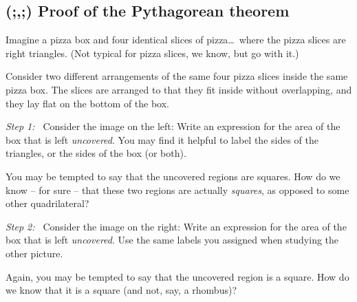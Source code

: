 \subsection{(;,;) Proof of the {P}ythagorean theorem}
\label{sec:pythagproof}

Imagine a pizza box and four identical slices of pizza\ldots\ where the pizza slices are right triangles. (Not typical for pizza slices, we know, but go with it.)

\begin{center}
\end{center}

Consider two different arrangements of the same four pizza slices inside the same pizza box. The slices are arranged to that they fit inside without overlapping, and they lay flat on the bottom of the box.

\begin{center}
\end{center}

\textit{Step 1:~} Consider the image on the left: Write an expression for the area of the box that is left \textit{uncovered}. You may find it helpful to label the sides of the triangles, or the sides of the box (or both).

You may be tempted to say that the uncovered regions are squares. How do we know -- for sure -- that these two regions are actually \textit{squares}, as opposed to some other quadrilateral?

\textit{Step 2:~} Consider the image on the right: Write an expression for the area of the box that is left \textit{uncovered}. Use the same labels you assigned when studying the other picture.

Again, you may be tempted to say that the uncovered region is a square. How do we know that it is a square (and not, say, a rhombus)?

